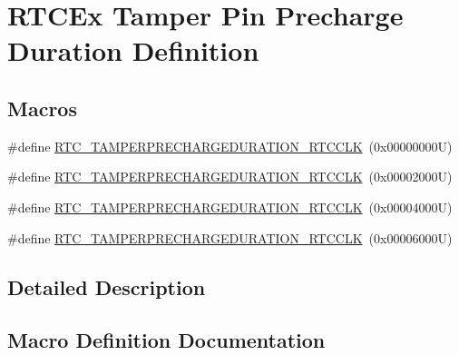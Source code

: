 \hypertarget{group___r_t_c_ex___tamper___pin___precharge___duration___definitions}{}\section{R\+T\+C\+Ex Tamper Pin Precharge Duration Definition}
\label{group___r_t_c_ex___tamper___pin___precharge___duration___definitions}
\subsection*{Macros}
\begin{DoxyCompactItemize}
\item 
\#define \hyperlink{group___r_t_c_ex___tamper___pin___precharge___duration___definitions_gac2a79623b1690b2e5893e6b53dad3480}{R\+T\+C\+\_\+\+T\+A\+M\+P\+E\+R\+P\+R\+E\+C\+H\+A\+R\+G\+E\+D\+U\+R\+A\+T\+I\+O\+N\+\_\+R\+T\+C\+C\+LK}~(0x00000000\+U)
\item 
\#define \hyperlink{group___r_t_c_ex___tamper___pin___precharge___duration___definitions_ga270be6ced6bafda4a94e5624a0bc3eab}{R\+T\+C\+\_\+\+T\+A\+M\+P\+E\+R\+P\+R\+E\+C\+H\+A\+R\+G\+E\+D\+U\+R\+A\+T\+I\+O\+N\+\_\+R\+T\+C\+C\+LK}~(0x00002000\+U)
\item 
\#define \hyperlink{group___r_t_c_ex___tamper___pin___precharge___duration___definitions_ga12497acabf044c2d1de7d735efdb2efc}{R\+T\+C\+\_\+\+T\+A\+M\+P\+E\+R\+P\+R\+E\+C\+H\+A\+R\+G\+E\+D\+U\+R\+A\+T\+I\+O\+N\+\_\+R\+T\+C\+C\+LK}~(0x00004000\+U)
\item 
\#define \hyperlink{group___r_t_c_ex___tamper___pin___precharge___duration___definitions_ga353fca64c5b0e927ab024ed13a526e09}{R\+T\+C\+\_\+\+T\+A\+M\+P\+E\+R\+P\+R\+E\+C\+H\+A\+R\+G\+E\+D\+U\+R\+A\+T\+I\+O\+N\+\_\+R\+T\+C\+C\+LK}~(0x00006000\+U)
\end{DoxyCompactItemize}


\subsection{Detailed Description}


\subsection{Macro Definition Documentation}
\mbox{\label{group___r_t_c_ex___tamper___pin___precharge___duration___definitions_gac2a79623b1690b2e5893e6b53dad3480}} 
